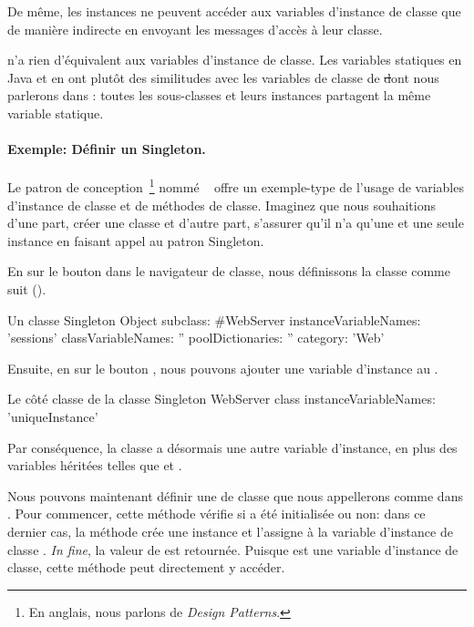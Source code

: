 \documentclass[a4paper,10pt,twoside]{book}
\begin{document}
De même, les instances ne peuvent accéder aux variables d'instance de classe
que de manière indirecte en envoyant les messages d'accès à leur classe.

 n'a rien d'équivalent aux variables d'instance de classe.  
Les variables statiques en Java et en  ont plutôt des similitudes 
avec les variables de classe de \st dont nous parlerons dans : toutes les sous-classes et leurs instances partagent la même variable statique.

\paragraph{Exemple: Définir un Singleton.}
Le patron de conception~\footnote{En anglais, nous parlons de \emph{Design Patterns}.} nommé ~\cite{Alpe98a} offre un exemple-type de l'usage de variables d'instance de classe et de méthodes de classe.
Imaginez que nous souhaitions d'une part, créer une classe  et d'autre part, s'assurer qu'il n'a qu'une et une seule instance en faisant appel au patron Singleton.

En \clickant{} sur le bouton  dans le navigateur de classe, nous définissons la classe  comme suit ().

\begin{classdef}[singleton]{Un classe Singleton}
Object subclass: #WebServer
	instanceVariableNames: 'sessions' 	
	classVariableNames: '' 	
	poolDictionaries: ''
	category: 'Web'
\end{classdef}

Ensuite, en \clickant{} sur le bouton , nous pouvons ajouter une variable d'instance  au .

\begin{classdef}[webserver]{Le côté classe de la classe Singleton}
WebServer class 	
	instanceVariableNames: 'uniqueInstance'
\end{classdef}

Par conséquence, la classe  a désormais une autre variable d'instance, en plus des variables héritées telles que  et .

Nous pouvons maintenant définir une  de classe que nous appellerons  comme dans . 
Pour commencer, cette méthode vérifie si  a été initialisée ou non: dans ce dernier cas,
la méthode crée une instance et l'assigne à la variable d'instance de classe .  
\emph{In fine}, la valeur de  est retournée.
Puisque  est une variable d'instance de classe, cette méthode peut directement y accéder.
\end{document}

